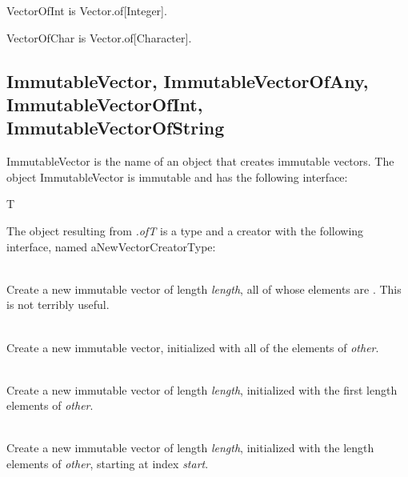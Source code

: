 \label{builtin VectorOfInt}
VectorOfInt is Vector.of[Integer].

\label{builtin VectorOfChar}
VectorOfChar is Vector.of[Character].

\subsection{ImmutableVector, ImmutableVectorOfAny, ImmutableVectorOfInt, ImmutableVectorOfString}
\label{builtin ImmutableVector}

ImmutableVector is the name of an object that creates immutable vectors.
The object
ImmutableVector is immutable and has the following interface:

\begin{desc}
  \item[\kw{function} of\/\LB{}T \CO{} \tn{Type}\/\RB{} \returns{} \/\LB{}aNewVectorCreatorType\/\RB{}] T
\end{desc}

\noindent The object resulting from
{\it {}.of\/\LB{}T\/\RB{}}
is a type and a creator with the following interface, named
aNewVectorCreatorType:

\begin{desc}
  \item[\kw{operation} create\/\LB{}length \CO{} \tn{Integer}\/\RB{} \returns{} \/\LB{}aNewVectorType\/\RB{}]~\\
    Create a new immutable vector of length {\it length}, all of whose
    elements are .  This is not terribly useful.
  \item[\kw{operation} literal\/\LB{}other \CO{} Sequence.of\/\LB{}T\/\RB{}\/\RB{} \returns{} \/\LB{}aNewVectorType\/\RB{}]~\\
    Create a new immutable vector, initialized with all of the elements of
    {\it other}.
  \item[\kw{operation} literal\/\LB{}other \CO{} Sequence.of\/\LB{}T\/\RB{}, length \CO{} \tn{Integer}\/\RB{} \returns{} \/\LB{}aNewVectorType\/\RB{}]~\\
    Create a new immutable vector of length {\it length}, initialized with
    the first length elements of {\it other}.
  \item[\kw{operation} literal\/\LB{}other \CO{} Sequence.of\/\LB{}T\/\RB{}, start \CO{} Integer, length \CO{} \tn{Integer}\/\RB{} \returns{} \/\LB{}aNewVectorType\/\RB{}]~\\
    Create a new immutable vector of length {\it length}, initialized with
    the length elements of {\it other}, starting at index {\it start}.
\end{desc}

